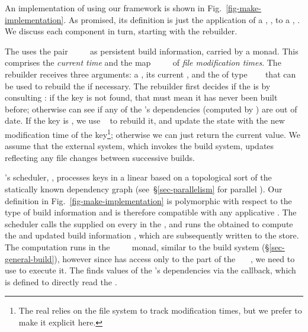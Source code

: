 An implementation of \Make using our framework is shown in
Fig.~\ref{fig-make-implementation}. As promised, its definition
is just the application of a , ,
to a , .
We discuss each component in turn, starting with the rebuilder.

The  uses the pair
~~\hs{=}~~ as persistent
build information, carried by a  monad. This
 comprises the \emph{current time}  and the map
~\hs{::}~~~ of \emph{file
modification times}. The rebuilder receives three arguments: a
, its current , and the  of type
~~~ that can be used to rebuild
the  if necessary.  The rebuilder first decides if the
 is  by consulting : if the key is not
found, that must mean it has never been built before; otherwise
 can see if any of the 's dependencies
(computed by ) are out of date. If the key is
, we use ~ to rebuild it, and update the state with
the new modification time of the key\footnote{The real \Make
relies on the file system to track modification times, but we prefer
to make it explicit here.}; otherwise we can just return the current value.
We assume that the external system, which invokes the build system, updates
~ reflecting any file changes between successive builds.

\Make's scheduler, , processes keys in a linear  based on a
topological sort of the statically known dependency graph
(see~\S\ref{sec-parallelism} for parallel \Make). Our definition in
Fig.~\ref{fig-make-implementation} is polymorphic with respect to the type of
build information  and is therefore compatible with any applicative
. The scheduler calls the supplied  on every
 in the , and runs the obtained  to compute the
 and updated build information , which are subsequently
written to the store. The computation runs in the
~~~~ monad, similar to the 
build system (\S\ref{sec-general-build}), however since  has access
only to the  part of the ~~~, we need to use
 to execute it. The  finds values of the 's
dependencies via the  callback, which is defined to directly read the
.

